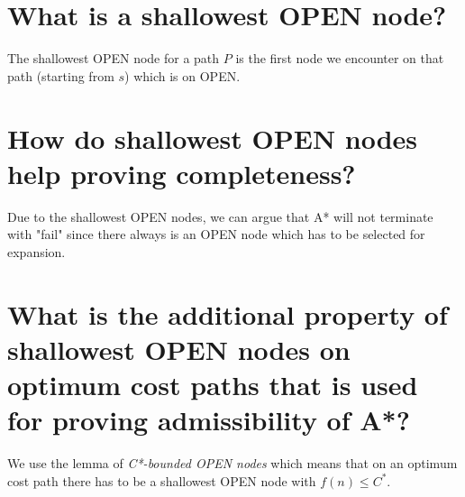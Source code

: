 \documentclass[12pt, a4paper]{article}
\begin{document}
\section{What is a shallowest OPEN node?}
The shallowest OPEN node for a path $P$ is the first node we encounter on that path (starting from $s$) which is on OPEN.

\section{How do shallowest OPEN nodes help proving completeness?}
Due to the shallowest OPEN nodes, we can argue that A* will not terminate with "fail" since there always is an OPEN node which has to be selected for expansion.

\section{What is the additional property of shallowest OPEN nodes on optimum cost paths that is used for proving admissibility of A*?}
We use the lemma of \textit{C*-bounded OPEN nodes} which means that on an optimum cost path there has to be a shallowest OPEN node with $f(n) \leq C^*$. 
\end{document}

